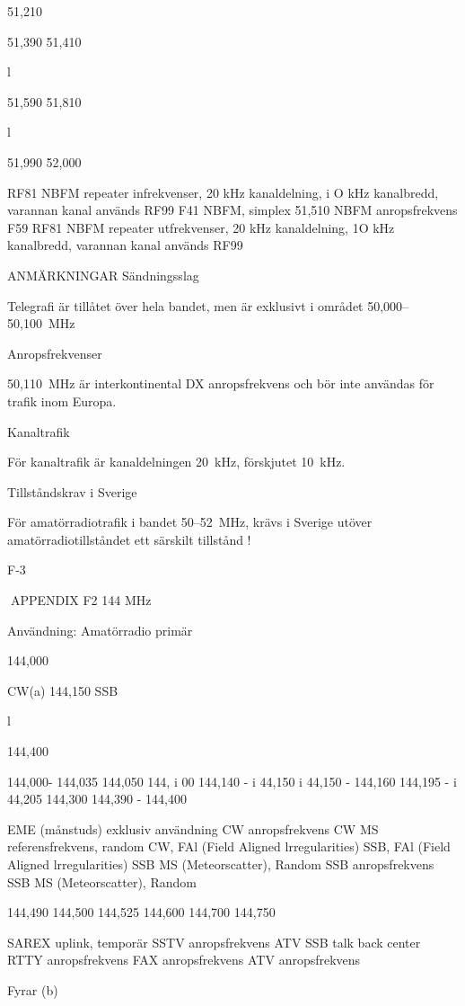 
51,210

51,390
51,410

l

51,590
51,810

l

51,990
52,000



RF81
NBFM repeater infrekvenser, 20 kHz kanaldelning, i O kHz kanalbredd, varannan kanal används
RF99
F41
NBFM, simplex
51,510
NBFM anropsfrekvens
F59
RF81
NBFM repeater utfrekvenser, 20 kHz kanaldelning, 1O kHz kanalbredd, varannan kanal används
RF99

ANMÄRKNINGAR
Sändningsslag

Telegrafi är tillåtet över hela bandet, men är exklusivt i området 50,000--50,100~MHz

Anropsfrekvenser

50,110~MHz är interkontinental DX anropsfrekvens och bör inte användas för trafik inom Europa.

Kanaltrafik

För kanaltrafik är kanaldelningen 20~kHz, förskjutet 10~kHz.

Tillståndskrav i Sverige

För amatörradiotrafik i bandet 50--52~MHz, krävs i Sverige utöver amatörradiotillståndet ett särskilt tillstånd !

F-3

APPENDIX F2
144 MHz

Användning: Amatörradio primär

144,000

CW(a)
144,150
SSB

l

144,400

144,000- 144,035
144,050
144, i 00
144,140 - i 44,150
i 44,150 - 144,160
144,195 - i 44,205
144,300
144,390 - 144,400

EME (månstuds) exklusiv användning
CW anropsfrekvens
CW MS referensfrekvens, random
CW, FAl (Field Aligned lrregularities)
SSB, FAl (Field Aligned lrregularities)
SSB MS (Meteorscatter), Random
SSB anropsfrekvens
SSB MS (Meteorscatter), Random

144,490
144,500
144,525
144,600
144,700
144,750

SAREX uplink, temporär
SSTV anropsfrekvens
ATV SSB talk back center
RTTY anropsfrekvens
FAX anropsfrekvens
ATV anropsfrekvens

Fyrar (b)

